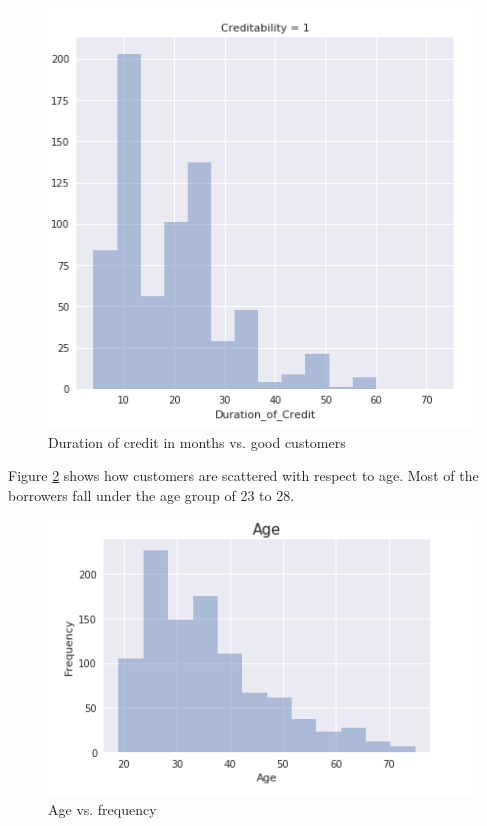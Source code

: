 \documentclass[sigconf]{acmart}
\begin{document}
\begin{figure}[htb]
  \centering
  \includegraphics[width=1.0\columnwidth]{images/Figure14.png}
  \caption{Duration of credit in months vs. good customers}
  \label{fig:Figure14} 
\end{figure}

Figure \ref{fig:Figure15} shows how customers are scattered with respect to age. Most of the borrowers fall under the age group of 23 to 28.

\begin{figure}[htb]
  \centering
  \includegraphics[width=1.0\columnwidth]{images/Figure15.png}
  \caption{Age vs. frequency}
  \label{fig:Figure15} 
\end{figure}
\end{document}
